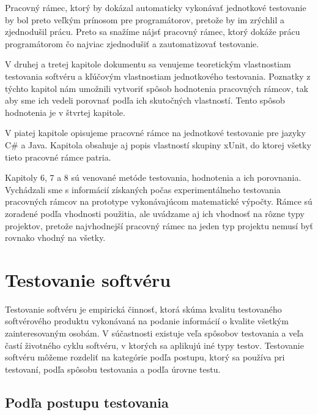 \documentclass[11pt,twoside,slovak,a4paper]{article}
\begin{document}
	Pracovný rámec, ktorý by dokázal automaticky vykonávať jednotkové testovanie by bol preto veľkým prínosom pre programátorov, pretože by im zrýchlil a zjednodušil prácu. Preto sa snažíme nájsť pracovný rámec, ktorý dokáže prácu programátorom čo najviac zjednodušiť a zautomatizovať testovanie.
	
	V druhej a tretej kapitole dokumentu sa venujeme teoretickým vlastnostiam testovania softvéru a kľúčovým vlastnostiam jednotkového testovania. Poznatky z týchto kapitol nám umožnili vytvoriť spôsob hodnotenia pracovných rámcov, tak aby sme ich vedeli porovnať podľa ich skutočných vlastností. Tento spôsob hodnotenia je v štvrtej kapitole.
	
	V piatej kapitole opisujeme pracovné rámce na jednotkové testovanie pre jazyky C\# a Java. Kapitola obsahuje aj popis vlastností skupiny xUnit, do ktorej všetky tieto pracovné rámce patria.
	
	Kapitoly 6, 7 a 8 sú venované metóde testovania, hodnotenia a ich porovnania. Vychádzali sme s informácií získaných počas experimentálneho testovania pracovných rámcov na prototype vykonávajúcom matematické výpočty. Rámce sú zoradené podľa vhodnosti použitia, ale uvádzame aj ich vhodnosť na rôzne typy projektov, pretože najvhodnejší pracovný rámec na jeden typ projektu nemusí byť rovnako vhodný na všetky.	
	
	\newpage
	\thispagestyle{plain}
	\section{Testovanie softvéru}
	Testovanie softvéru je empirická činnosť, ktorá skúma kvalitu testovaného softvérového produktu vykonávaná na podanie informácií o kvalite všetkým zainteresovaným osobám\cite{Kaner2006}. V súčastnosti existuje veľa spôsobov testovania a veľa častí životného cyklu softvéru, v ktorých sa aplikujú iné typy testov. Testovanie softvéru môžeme rozdeliť na kategórie podľa postupu, ktorý sa používa pri testovaní, podľa spôsobu testovania a podľa úrovne testu.
	
	\subsection{Podľa postupu testovania}
\end{document}
